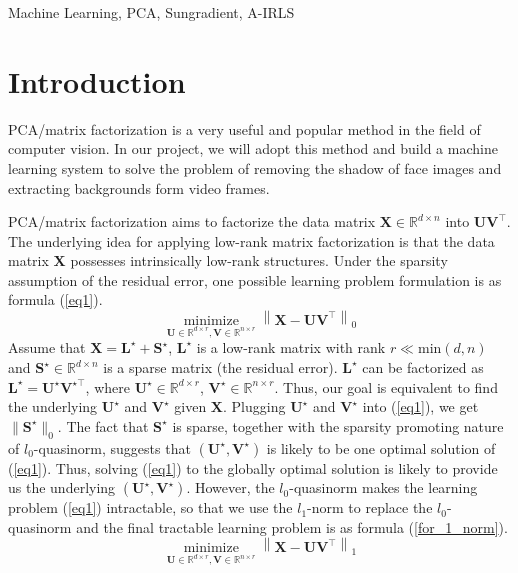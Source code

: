 \documentclass[conference]{IEEEtran}
\begin{document}
\begin{IEEEkeywords}
Machine Learning, PCA, Sungradient, A-IRLS
\end{IEEEkeywords}
\section{Introduction}
PCA/matrix factorization is a very useful and popular method in the field of computer vision. In our project, we will adopt this method and build a machine learning system to solve the problem of removing the shadow of face images and extracting backgrounds form video frames.

PCA/matrix factorization aims to factorize the data matrix $\boldsymbol{X}\in\mathbb{R}^{d\times n}$ into $\boldsymbol{U}\boldsymbol{V}^{\top}$. The underlying idea for applying low-rank matrix factorization is that the data matrix $\boldsymbol{X}$ possesses intrinsically low-rank structures. Under the sparsity assumption of the residual error, one possible learning problem formulation is as formula (\ref{eq1}).
\begin{equation}
    \label{eq1}
    \underset{\boldsymbol{U} \in \mathbb{R}^{d \times r}, \boldsymbol{V} \in \mathbb{R}^{n \times r}}{\operatorname{minimize}}\left\|\boldsymbol{X}-\boldsymbol{U} \boldsymbol{V}^{\top}\right\|_{0}
\end{equation}
Assume that $\boldsymbol{X}=\boldsymbol{L}^{\star} + \boldsymbol{S}^{\star}$, $\boldsymbol{L}^{\star}$ is a low-rank matrix with rank $r\ll\text{min}\left(d,n\right)$ and $\boldsymbol{S}^{\star}\in\mathbb{R}^{d\times n}$ is a sparse matrix (the residual error). $\boldsymbol{L}^{\star}$ can be factorized as $\boldsymbol{L}^{\star}=\boldsymbol{U}^{\star}\boldsymbol{V}^{\star\top}$, where $\boldsymbol{U}^{\star}\in\mathbb{R}^{d\times r}$, $\boldsymbol{V}^{\star}\in\mathbb{R}^{n\times r}$. Thus, our goal is equivalent to find the underlying $\boldsymbol{U}^{\star}$ and $\boldsymbol{V}^{\star}$ given $\boldsymbol{X}$. Plugging $\boldsymbol{U}^{\star}$ and $\boldsymbol{V}^{\star}$ into (\ref{eq1}), we get $\|\boldsymbol{S}^{\star}\|_0$. The fact that $\boldsymbol{S}^{\star}$ is sparse, together with the sparsity promoting nature
of $l_0$-quasinorm, suggests that $\left(\boldsymbol{U}^{\star},\boldsymbol{V}^{\star}\right)$ is likely to be one optimal solution of (\ref{eq1}). Thus, solving (\ref{eq1}) to the globally optimal solution is likely to provide us the underlying $\left(\boldsymbol{U}^{\star},\boldsymbol{V}^{\star}\right)$.
However, the $l_0$-quasinorm makes the learning problem (\ref{eq1}) intractable, so that we use the $l_1$-norm to replace the $l_0$-quasinorm and the final tractable learning problem is as formula (\ref{for_1_norm}).
\begin{equation}
    \label{for_1_norm}
    \underset{\boldsymbol{U} \in \mathbb{R}^{d \times r}, \boldsymbol{V} \in \mathbb{R}^{n \times r}}{\operatorname{minimize}}\left\|\boldsymbol{X}-\boldsymbol{U} \boldsymbol{V}^{\top}\right\|_{1}
\end{equation}
\end{document}
